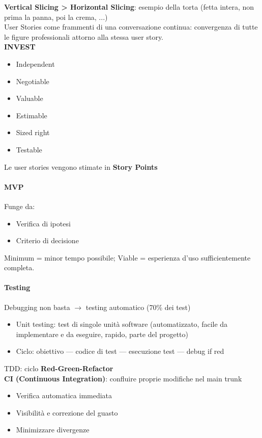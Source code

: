 \documentclass[12pt]{extarticle}
\begin{document}
\noindent \textbf{Vertical Slicing > Horizontal Slicing}: esempio della torta (fetta intera, non prima la panna, poi la crema, ...)\\

\noindent User Stories come frammenti di una conversazione continua: convergenza di tutte le figure professionali attorno alla stessa user story.\\

\noindent \textbf{INVEST}
\begin{itemize}
    \item Independent
    \item Negotiable
    \item Valuable
    \item Estimable
    \item Sized right
    \item Testable
\end{itemize}

\noindent Le user stories vengono stimate in \textbf{Story Points}


\paragraph{MVP} Funge da:
\begin{itemize}
    \item Verifica di ipotesi
    \item Criterio di decisione
\end{itemize}
Minimum = minor tempo possibile; Viable = esperienza d'uso sufficientemente completa.

\paragraph{Testing} Debugging non basta $\rightarrow$ testing automatico (70\% dei test)
\begin{itemize}
    \item Unit testing: test di singole unità software (automatizzato, facile da implementare e da eseguire, rapido, parte del progetto)
    \item Ciclo: obiettivo --- codice di test --- esecuzione test --- debug if red
\end{itemize}

\noindent TDD: ciclo \textbf{Red-Green-Refactor}\\

\noindent \textbf{CI (Continuous Integration)}: confluire proprie modifiche nel main trunk
\begin{itemize}
    \item Verifica automatica immediata
    \item Visibilità e correzione del guasto
    \item Minimizzare divergenze
\end{itemize}
\end{document}
